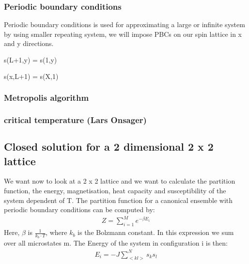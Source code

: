\documentclass[10pt,a4paper]{article}
\begin{document}
  \subsubsection{Periodic boundary conditions} 
Periodic boundary conditions is used for approximating a large or infinite system by using smaller repeating system, we will impose PBCs on our spin lattice in x and y directions.

 s(L+1,y) = s(1,y)
 
 s(x,L+1) = s(X,1)  

\subsubsection{Metropolis algorithm}
\subsubsection{critical temperature (Lars Onsager)}
\subsection{Closed solution for a 2 dimensional 2 x 2 lattice}

We want now to look at a 2 x 2 lattice and we want to calculate the partition function, the energy, magnetisation, heat capacity and susceptibility of the system  dependent of T. 
The partition function for a canonical ensemble with periodic boundary conditions can be computed  by:
\begin{align}
Z= \sum_{i=1}^{M} e^{- \beta E_i}
\end{align} 
Here, $\beta$ is $\frac{1}{k_b \cdot T}$, where $k_b$ is the Bolzmann constant. 
In this expression we sum over all microstates m. The Energy of the system in configuration i is then:
\begin{align}
E_i = - J \sum_{<kl>}^N s_k s_l 
\end{align} 
\end{document}

